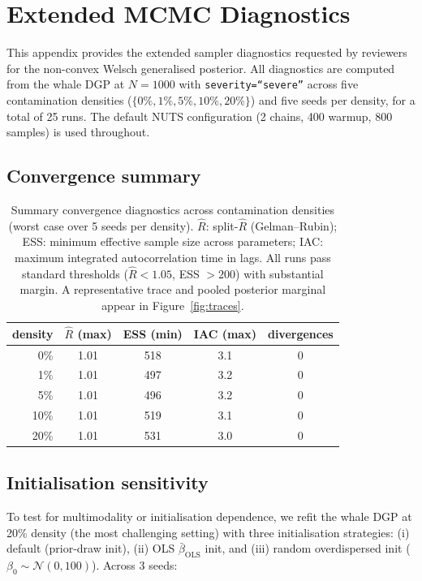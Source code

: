 \section{Extended MCMC Diagnostics}
\label{app:mcmc_diagnostics}

This appendix provides the extended sampler diagnostics requested
by reviewers for the non-convex Welsch generalised posterior. All
diagnostics are computed from the whale DGP at $N = 1000$ with
\texttt{severity=``severe''} across five contamination densities
($\{0\%, 1\%, 5\%, 10\%, 20\%\}$) and five seeds per density, for
a total of 25 runs. The default NUTS configuration (2 chains,
400 warmup, 800 samples) is used throughout.

\subsection{Convergence summary}
\label{app:mcmc:convergence}

\begin{table}[!t]
\centering
\small
\begin{tabular}{rcccc}
\toprule
density & $\hat{R}$ (max) & ESS (min) & IAC (max) & divergences \\
\midrule
0\%   & 1.01 & 518 & 3.1 & 0 \\
1\%   & 1.01 & 497 & 3.2 & 0 \\
5\%   & 1.01 & 496 & 3.2 & 0 \\
10\%  & 1.01 & 519 & 3.1 & 0 \\
20\%  & 1.01 & 531 & 3.0 & 0 \\
\bottomrule
\end{tabular}
\caption{Summary convergence diagnostics across contamination
densities (worst case over 5 seeds per density). $\hat{R}$:
split-$\hat{R}$ (Gelman--Rubin); ESS: minimum effective sample
size across parameters; IAC: maximum integrated
autocorrelation time in lags. All runs pass standard thresholds
($\hat{R} < 1.05$, ESS $> 200$) with substantial
margin. A representative trace and pooled posterior marginal
appear in Figure~\ref{fig:traces}.}
\label{tab:mcmc_diagnostics}
\end{table}

\subsection{Initialisation sensitivity}
\label{app:mcmc:init}
To test for multimodality or initialisation dependence, we refit
the whale DGP at 20\% density (the most challenging setting) with
three initialisation strategies: (i) default (prior-draw init),
(ii) OLS $\bar\beta_{\mathrm{OLS}}$ init, and (iii) random
overdispersed init ($\beta_0 \sim \mathcal{N}(0, 100)$). Across 3
seeds:

